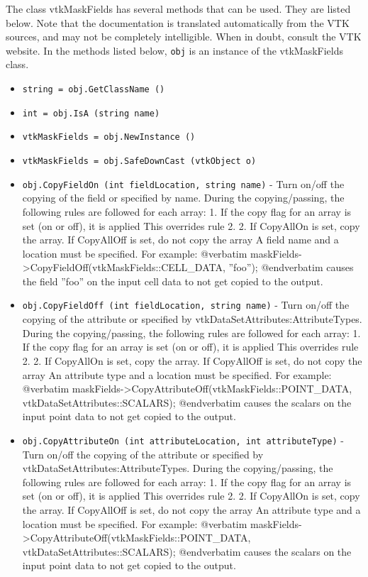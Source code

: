 The class vtkMaskFields has several methods that can be used.
  They are listed below.
Note that the documentation is translated automatically from the VTK sources,
and may not be completely intelligible.  When in doubt, consult the VTK website.
In the methods listed below, \verb|obj| is an instance of the vtkMaskFields class.
\begin{itemize}
\item  \verb|string = obj.GetClassName ()|

\item  \verb|int = obj.IsA (string name)|

\item  \verb|vtkMaskFields = obj.NewInstance ()|

\item  \verb|vtkMaskFields = obj.SafeDownCast (vtkObject o)|

\item  \verb|obj.CopyFieldOn (int fieldLocation, string name)| -  Turn on/off the copying of the field or specified by name.
 During the copying/passing, the following rules are followed for each
 array:
 1. If the copy flag for an array is set (on or off), it is applied
    This overrides rule 2.
 2. If CopyAllOn is set, copy the array.
    If CopyAllOff is set, do not copy the array
 A field name and a location must be specified. For example:
 @verbatim
 maskFields->CopyFieldOff(vtkMaskFields::CELL\_DATA, ''foo'');
 @endverbatim
 causes the field ''foo'' on the input cell data to not get copied
 to the output.

\item  \verb|obj.CopyFieldOff (int fieldLocation, string name)| -  Turn on/off the copying of the attribute or specified by vtkDataSetAttributes:AttributeTypes.
 During the copying/passing, the following rules are followed for each
 array:
 1. If the copy flag for an array is set (on or off), it is applied
    This overrides rule 2.
 2. If CopyAllOn is set, copy the array.
    If CopyAllOff is set, do not copy the array
 An attribute type and a location must be specified. For example:
 @verbatim
 maskFields->CopyAttributeOff(vtkMaskFields::POINT\_DATA, vtkDataSetAttributes::SCALARS);
 @endverbatim
 causes the scalars on the input point data to not get copied
 to the output.

\item  \verb|obj.CopyAttributeOn (int attributeLocation, int attributeType)| -  Turn on/off the copying of the attribute or specified by vtkDataSetAttributes:AttributeTypes.
 During the copying/passing, the following rules are followed for each
 array:
 1. If the copy flag for an array is set (on or off), it is applied
    This overrides rule 2.
 2. If CopyAllOn is set, copy the array.
    If CopyAllOff is set, do not copy the array
 An attribute type and a location must be specified. For example:
 @verbatim
 maskFields->CopyAttributeOff(vtkMaskFields::POINT\_DATA, vtkDataSetAttributes::SCALARS);
 @endverbatim
 causes the scalars on the input point data to not get copied
 to the output.


\end{itemize}
